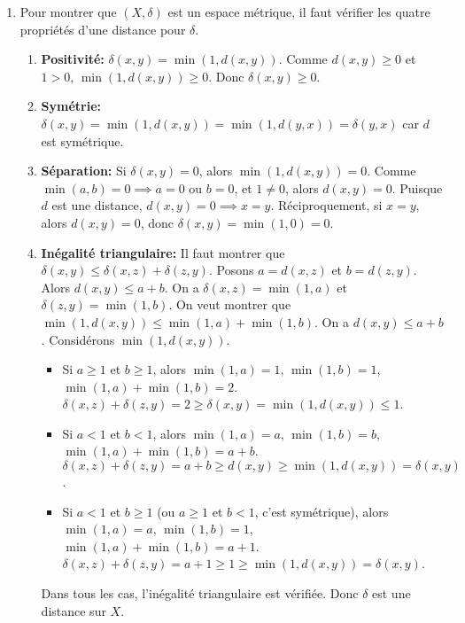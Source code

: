 \documentclass[oneside]{book}
\begin{document}
\begin{solution}
\begin{enumerate}
    \item Pour montrer que $(X, \delta)$ est un espace métrique, il faut vérifier les quatre propriétés d'une distance pour $\delta$.
    \begin{enumerate}
        \item \textbf{Positivité:} $\delta(x, y) = \min(1, d(x, y))$. Comme $d(x, y) \geq 0$ et $1 > 0$, $\min(1, d(x, y)) \geq 0$. Donc $\delta(x, y) \geq 0$.

        \item \textbf{Symétrie:} $\delta(x, y) = \min(1, d(x, y)) = \min(1, d(y, x)) = \delta(y, x)$ car $d$ est symétrique.

        \item \textbf{Séparation:} Si $\delta(x, y) = 0$, alors $\min(1, d(x, y)) = 0$. Comme $\min(a, b) = 0 \implies a = 0$ ou $b = 0$, et $1 \neq 0$, alors $d(x, y) = 0$. Puisque $d$ est une distance, $d(x, y) = 0 \implies x = y$. Réciproquement, si $x = y$, alors $d(x, y) = 0$, donc $\delta(x, y) = \min(1, 0) = 0$.

        \item \textbf{Inégalité triangulaire:} Il faut montrer que $\delta(x, y) \leq \delta(x, z) + \delta(z, y)$.
        Posons $a = d(x, z)$ et $b = d(z, y)$. Alors $d(x, y) \leq a + b$.
        On a $\delta(x, z) = \min(1, a)$ et $\delta(z, y) = \min(1, b)$. On veut montrer que $\min(1, d(x, y)) \leq \min(1, a) + \min(1, b)$.
        On a $d(x, y) \leq a + b$. Considérons $\min(1, d(x, y))$.
        \begin{itemize}
            \item Si $a \geq 1$ et $b \geq 1$, alors $\min(1, a) = 1$, $\min(1, b) = 1$, $\min(1, a) + \min(1, b) = 2$.
                  $\delta(x, z) + \delta(z, y) = 2 \geq \delta(x, y) = \min(1, d(x, y)) \leq 1$.
            \item Si $a < 1$ et $b < 1$, alors $\min(1, a) = a$, $\min(1, b) = b$, $\min(1, a) + \min(1, b) = a + b$.
                  $\delta(x, z) + \delta(z, y) = a + b \geq d(x, y) \geq \min(1, d(x, y)) = \delta(x, y)$.
            \item Si $a < 1$ et $b \geq 1$ (ou $a \geq 1$ et $b < 1$, c'est symétrique), alors $\min(1, a) = a$, $\min(1, b) = 1$, $\min(1, a) + \min(1, b) = a + 1$.
                  $\delta(x, z) + \delta(z, y) = a + 1 \geq 1 \geq \min(1, d(x, y)) = \delta(x, y)$.
        \end{itemize}
        Dans tous les cas, l'inégalité triangulaire est vérifiée. Donc $\delta$ est une distance sur $X$.


\end{enumerate}
\end{enumerate}
\end{solution}
\end{document}
